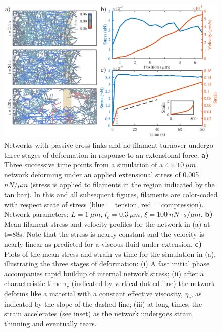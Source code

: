 \documentclass[10pt,letterpaper]{article}
\begin{document}
\begin{figure}[h!]
\centering
\includegraphics[width=\hsize]{figures/figure3a}
\caption{\label{fig:passive_ex}  Networks with passive cross-links and no filament turnover undergo three stages of deformation in response to an extensional force.   \textbf{a)} Three successive time points from a simulation of a $4\times10\: \mu m$ network deforming under an applied extensional stress of 0.005 $nN/\mu m$ (stress is applied to filaments in the region indicated by the tan bar). In this and all subsequent figures, filaments are color-coded with respect state of stress (blue = tension, red = compression).  Network parameters: $L=1\: \mu m$, $l_c=0.3\: \mu m$, $\xi=100\: nN\cdot s/\mu m$. \textbf{b)} Mean filament stress and velocity profiles for the  network in (a) at t=88s. Note that the stress is nearly constant and the velocity is nearly linear as predicted for a viscous fluid under extension.  \textbf{c)} Plots of the mean stress and strain vs time for the simulation in (a), illustrating the three stages of deformation: (i) A fast initial phase accompanies rapid buildup of internal network stress; (ii) after a characteristic time $\tau_c$ (indicated by vertical dotted line) the network deforms like a material with a constant effective viscosity, $\eta_c$, as indicated by the slope of the dashed line; (iii) at long times, the strain accelerates (see inset) as the network undergoes strain thinning and eventually tears. }
\end{figure}

\end{document}

